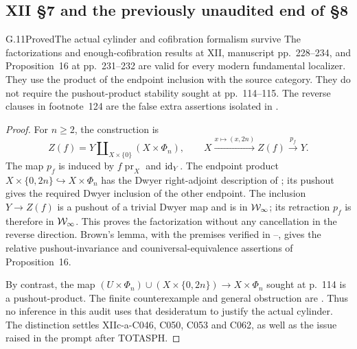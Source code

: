 \subsection{XII \S7 and the previously unaudited end of \S8}

\begin{claim}{G.11}{Proved}{The actual cylinder and cofibration formalism survive}
The factorizations and enough-cofibration results at XII, manuscript pp.~228--234, and Proposition~16 at pp.~231--232 are valid for every modern fundamental localizer. They use the product of the endpoint inclusion with the source category. They do not require the pushout-product stability sought at pp.~114--115. The reverse clauses in footnote~124 are the false extra assertions isolated in .
\end{claim}
\begin{proof}
For $n\geq2$, the construction is
\[
Z(f)=Y\amalg_{X\times\{0\}}(X\times\Phi_n),\qquad
X\xrightarrow{x\mapsto(x,2n)}Z(f)\xrightarrow{p_f}Y.
\]
The map $p_f$ is induced by $f\operatorname{pr}_X$ and $\mathrm{id}_Y$. The endpoint product $X\times\{0,2n\}\hookrightarrow X\times\Phi_n$ has the Dwyer right-adjoint description of ; its pushout gives the required Dwyer inclusion of the other endpoint. The inclusion $Y\to Z(f)$ is a pushout of a trivial Dwyer map and is in $\mathcal{W}_{\infty}$; its retraction $p_f$ is therefore in $\mathcal{W}_{\infty}$. This proves the factorization without any cancellation in the reverse direction. Brown's lemma, with the premises verified in --, gives the relative pushout-invariance and couniversal-equivalence assertions of Proposition~16.

By contrast, the map $(U\times\Phi_n)\cup(X\times\{0,2n\})\to X\times\Phi_n$ sought at p.~114 is a pushout-product. The finite counterexample and general obstruction are . Thus no inference in this audit uses that desideratum to justify the actual cylinder. The distinction settles XIIc-a-C046, C050, C053 and C062, as well as the issue raised in the prompt after TOTASPH.
\end{proof}


